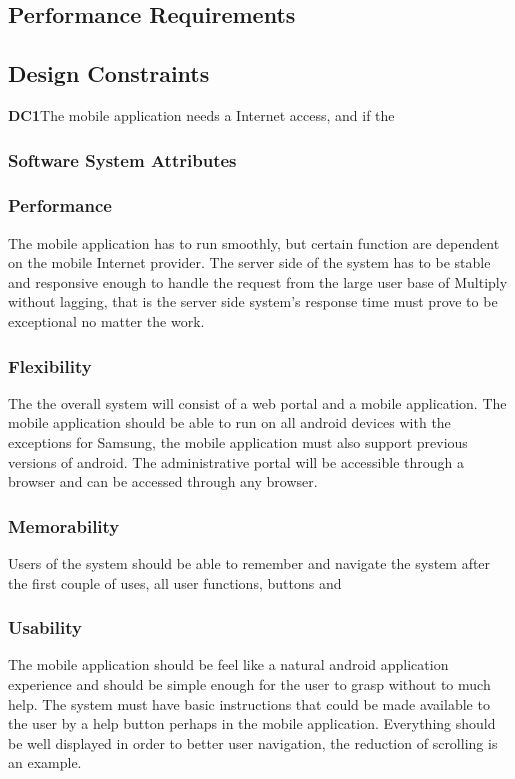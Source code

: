 \documentclass[11pt]{article}
\begin{document}
\subsection{Performance Requirements}
\subsection{Design Constraints}
\textbf{DC1}The mobile application needs a Internet access, and if the 
\subsubsection{Software System Attributes}
\subsubsection{Performance}
The mobile application has to run smoothly, but certain function are dependent on the mobile Internet provider. The server side of the system has to be stable and responsive enough to handle the request from the large user base of Multiply without lagging, that is the server side system's response time must prove to be exceptional no matter the work.
\subsubsection{Flexibility}
The the overall system will consist of a web portal and a mobile application. The mobile application should be able to run on all android devices with the exceptions for Samsung, the mobile application must also support previous versions of android. The administrative portal will be accessible through a browser and can be accessed through any browser.
\subsubsection{Memorability}
Users of the system should be able to remember and navigate the system after the first couple of uses, all user functions, buttons and   
\subsubsection{Usability}
The mobile application should be feel like a natural android application experience and should be simple enough for the user to grasp without to much help. The system must have basic instructions that could be made available to the user by a help button perhaps in the mobile application. Everything should be well displayed in order to better user navigation, the reduction of scrolling is an example.
\end{document}
